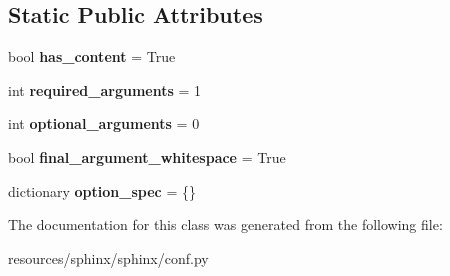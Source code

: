 \subsection*{Static Public Attributes}
\begin{DoxyCompactItemize}
\item 
\mbox{\label{classconf_1_1IfMode_aaea7225a5870ca4481d04f6ae781413f}} 
bool {\bfseries has\+\_\+content} = True
\item 
\mbox{\label{classconf_1_1IfMode_a6178050b552e80e923a467486ae3b6db}} 
int {\bfseries required\+\_\+arguments} = 1
\item 
\mbox{\label{classconf_1_1IfMode_a76d350d5aabb8c2dbdf47199a4b5b594}} 
int {\bfseries optional\+\_\+arguments} = 0
\item 
\mbox{\label{classconf_1_1IfMode_aeb33a9725e6fc1216412d321cd46db09}} 
bool {\bfseries final\+\_\+argument\+\_\+whitespace} = True
\item 
\mbox{\label{classconf_1_1IfMode_a0e789bd8ead3911da5a47a2ed0f66cb7}} 
dictionary {\bfseries option\+\_\+spec} = \{\}
\end{DoxyCompactItemize}


The documentation for this class was generated from the following file\+:\begin{DoxyCompactItemize}
\item 
resources/sphinx/sphinx/conf.\+py\end{DoxyCompactItemize}

